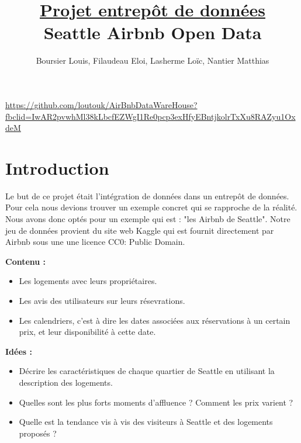 \documentclass[11pt, a4paper]{article}
\title{ \uline{\Huge{\textbf{Projet entrepôt de données}}} \\ Seattle Airbnb Open Data}
\author{Boursier Louis, Filaudeau Eloi, Lasherme Loïc, Nantier Matthias}
\date{}
\newcommand\tab{\hspace*{12.5mm}}
\begin{document}
\maketitle
\vfill

\begin{center}
\url{https://github.com/loutouk/AirBnbDataWareHouse?fbclid=IwAR2pvwhMl38kLbcfEZWgI1Re0pcp3exHfyEBntjkolrTxXu8RAZyu1OxdeM}
\end{center}
\newpage
\tableofcontents
\newpage

\section{Introduction}
\tab Le but de ce projet était l'intégration de données dans un entrepôt de données. Pour cela nous devions trouver un exemple concret qui se rapproche de la réalité. Nous avons donc optés pour un exemple qui est : "les Airbnb de Seattle". Notre jeu de données provient du site web Kaggle qui est fournit directement par Airbnb sous une une licence CC0: Public Domain.
\vspace{5mm}

\begin{minipage}[t]{0.45\linewidth}
   \textbf{\Large{Contenu :}}
   \begin{itemize}[label=\textbullet]
      \item Les logements avec leurs propriétaires.
      \item Les avis des utilisateurs sur leurs résevrations.
      \item Les calendriers, c'est à dire les dates associées aux réservations à un certain prix, et leur disponibilité à cette date.
   \end{itemize}
\end{minipage}
\hfill
\begin{minipage}[t]{0.45\linewidth}
   \textbf{\Large{Idées :}}
   \begin{itemize}[label=\textbullet]
      \item Décrire les caractéristiques de chaque quartier de Seattle en utilisant la description des logements.
      \item Quelles sont les plus forts moments d'affluence ? Comment les prix varient ?
      \item Quelle est la tendance vis à vis des visiteurs à Seattle et des logements proposés ?
   \end{itemize}
\end{minipage}
\vspace{5mm}
\end{document}
